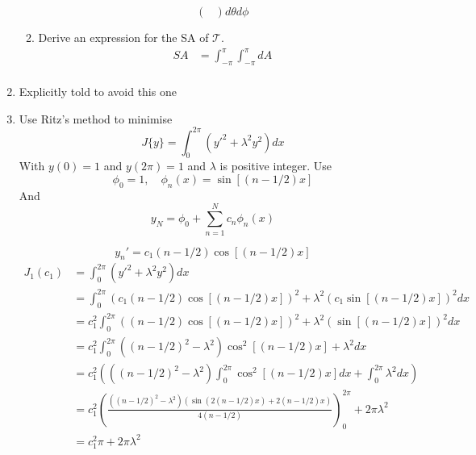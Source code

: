 \documentclass{E:/Documents/Latex/myassignment}
\begin{document}
\begin{enumerate}
\begin{enumerate}
\[\begin{pmatrix}
		\end{pmatrix}d\theta d\phi\]
		\item Derive an expression for the SA of $\mathcal{T}$.
		\begin{align*}
			SA &= \int_{-\pi}^\pi \int_{-\pi}^\pi dA\\
		\end{align*}
	\end{enumerate}
	\item Explicitly told to avoid this one
	\item Use Ritz's method to minimise
	\[J\{y\} = \int_0^{2\pi} (y'^2 + \lambda^2 y^2) dx\]
	With $y(0) = 1$ and $y(2\pi) = 1$ and $\lambda$ is positive integer. Use
	\[\phi_0 = 1, \quad \phi_n(x) = \sin[(n-1/2)x]\]
	And
	\[y_N = \phi_0 + \sum_{n=1}^N c_n \phi_n(x)\]

	\[y_n' =  c_1(n-1/2)\cos[(n-1/2)x]\]
	\begin{align*}
		J_1(c_1) &= \int_0^{2\pi} (y'^2 + \lambda^2 y^2) dx\\
		&= \int_0^{2\pi} (c_1(n-1/2)\cos[(n-1/2)x])^2 + \lambda^2(c_1\sin[(n-1/2)x])^2 dx\\
		&= c_1^2\int_0^{2\pi} ((n-1/2)\cos[(n-1/2)x])^2 + \lambda^2(\sin[(n-1/2)x])^2 dx\\
		&= c_1^2\int_0^{2\pi} ((n-1/2)^2-\lambda^2)\cos^2[(n-1/2)x] + \lambda^2 dx\\
		&= c_1^2 \left(((n-1/2)^2-\lambda^2)\int_0^{2\pi} \cos^2[(n-1/2)x] dx + \int_0^{2\pi} \lambda^2 dx\right) \\
		&= c_1^2 \left(\frac{((n-1/2)^2-\lambda^2)(\sin(2 (n-1/2)x) + 2(n-1/2)x)}{4(n-1/2)}\right)_0^{2\pi} + 2\pi\lambda^2 \\
		&= c_1^2 \pi + 2\pi\lambda^2 \\
	\end{align*}
\end{enumerate}
\end{document}
